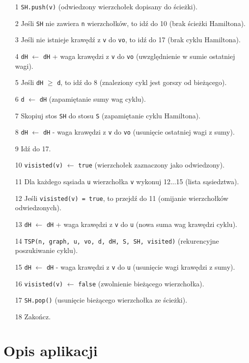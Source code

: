 \documentclass[12pt,a4paper]{report}
\begin{document}
\begin{itemize}
  \item[1] \verb+SH.push(v)+ (odwiedzony wierzchołek dopisany do ścieżki).
  \item[2] Jeśli \verb+SH+ nie zawiera \verb+n+ wierzchołków, to idź do 10 (brak ścieżki Hamiltona).
  \item[3] Jeśli nie istnieje krawędź z \verb+v+ do \verb+vo+, to idź do 17 (brak cyklu Hamiltona).
  \item[4] \verb+dH+ $\leftarrow$ \verb+dH+ + waga krawędzi z \verb+v+ do \verb+vo+ (uwzględnienie w sumie ostatniej wagi).
  \item[5] Jeśli \verb+dH+ $\geq$ \verb+d+, to idź do 8 (znaleziony cykl jest gorszy od bieżącego).
  \item[6] \verb+d+ $\leftarrow$ \verb+dH+ (zapamiętanie sumy wag cyklu).
  \item[7] Skopiuj stos \verb+SH+ do stosu \verb+S+ (zapamiętanie cyklu Hamiltona).
  \item[8] \verb+dH+ $\leftarrow$ \verb+dH+ - waga krawędzi z \verb+v+ do \verb+vo+ (usunięcie ostatniej wagi z sumy).
  \item[9] Idź do 17.
  \item[10] \verb+visisted(v)+ $\leftarrow$ \verb+true+ (wierzchołek zaznaczony jako odwiedzony).
  \item[11] Dla każdego sąsiada \verb+u+ wierzchołka \verb+v+ wykonuj 12...15 (lista sąsiedztwa).
  \item[12] Jeśli \verb+visisted(v) = true+, to przejdź do 11 (omijanie wierzchołków odwiedzonych).
  \item[13] \verb+dH+ $\leftarrow$ \verb+dH+ + waga krawędzi z \verb+v+ do \verb+u+ (nowa suma wag krawędzi cyklu).
  \item[14] \verb+TSP(n, graph, u, vo, d, dH, S, SH, visited)+ (rekurencyjne poszukiwanie cyklu).
  \item[15] \verb+dH+ $\leftarrow$ \verb+dH+ - waga krawędzi z \verb+v+ do \verb+u+ (usunięcie wagi krawędzi z sumy).
  \item[16] \verb+visisted(v)+ $\leftarrow$ \verb+false+ (zwolnienie bieżącego wierzchołka).
  \item[17] \verb+SH.pop()+ (usunięcie bieżącego wierzchołka ze ścieżki).
  \item[18] Zakończ.
\end{itemize}

\chapter{Opis aplikacji}
\end{document}
